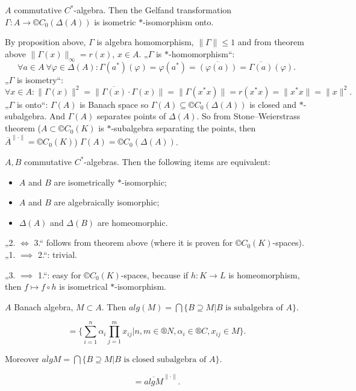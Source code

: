 \documentclass[12pt]{article}					%
\begin{document}
\begin{veta}
	$A$ commutative $C^*$-algebra. Then the Gelfand transformation $Γ: A \rightarrow ©C_0(Δ(A))$ is isometric $*$-isomorphism onto.

	\begin{dukazin}
		By proposition above, $Γ$ is algebra homomorphism, $\|Γ\| ≤ 1$ and from theorem above $\|Γ(x)\|_∞ = r(x)$, $x \in A$. „$Γ$ is $*$-homomorphism“:
		$$ \forall a \in A\ \forall φ \in Δ(A): Γ(a^*)(φ) = φ(a^*) = \overline{(φ(a))} = \overline{Γ(a)}(φ). $$
		„$Γ$ is isometry“:
		$$ \forall x \in A: \|Γ(x)\|^2 = \|\overline{Γ(x)}·Γ(x)\| = \|Γ(x^*x)\| = r(x^*x) = \|x^*x\| = \|x\|^2. $$
		„$Γ$ is onto“: $Γ(A)$ is Banach space so $Γ(A) \subseteq ©C_0(Δ(A))$ is closed and $*$-subalgebra. And $Γ(A)$ separates points of $Δ(A)$. So from Stone–Weierstrass theorem ($A \subset ©C_0(K)$ is \hbox{$*$-subalgebra} separating the points, then $\overline{A}^{\|·\|} = ©C_0(K)$) $Γ(A) = ©C_0(Δ(A))$.
	\end{dukazin}
\end{veta}

\begin{dusledek}
	$A, B$ commutative $C^*$-algebras. Then the following items are equivalent:\vspace{-1em}
	\begin{itemize}
		\item $A$ and $B$ are isometrically $*$-isomorphic;
		\item $A$ and $B$ are algebraically isomorphic;
		\item $Δ(A)$ and $Δ(B)$ are homeomorphic.
	\end{itemize}

	\begin{dukazin}
		„2. $\Leftrightarrow$ 3.“ follows from theorem above (where it is proven for $©C_0(K)$-spaces). „1. $\implies$ 2.“: trivial.

		„3. $\implies$ 1.“: easy for $©C_0(K)$-spaces, because if $h: K \rightarrow L$ is homeomorphism, then $f \mapsto f \circ h$ is isometrical $*$-isomorphism.
	\end{dukazin}
\end{dusledek}

\begin{definice}
	$A$ Banach algebra, $M \subset A$. Then $alg(M) = \bigcap \{B \supseteq M | B \text{ is subalgebra of } A\}$.

	\begin{poznamka}[Easy]
		$$ = \{\sum_{i=1}^n \alpha_i \prod_{j=1}^m x_{ij} | n, m \in ®N, \alpha_i \in ®C, x_{ij} \in M\}. $$
	\end{poznamka}

	Moreover $\overline{alg} M = \bigcap \{B \supseteq M | B \text{ is closed subalgebra of } A\}$.

	\begin{poznamka}[Easy]
		$$ = \overline{alg M}^{\|·\|}. $$
	\end{poznamka}
\end{definice}
\end{document}
